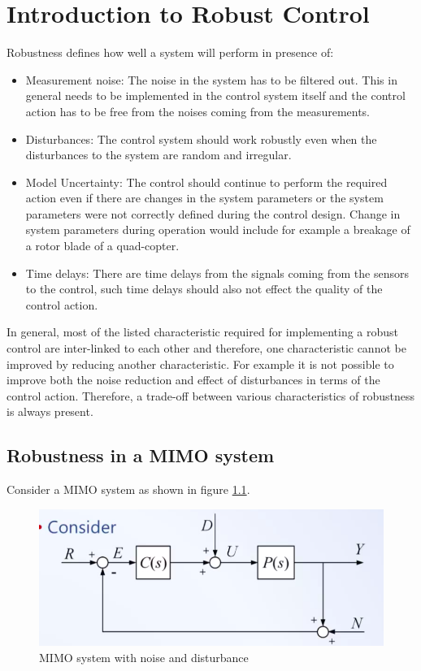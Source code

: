 \chapter{Introduction to Robust Control}

Robustness defines how well a system will perform in presence of:
\begin{itemize}
	\item Measurement noise: The noise in the system has to be filtered out. This in general needs to be implemented in the control system itself and the control action has to be free from the noises coming from the measurements.
	\item Disturbances: The control system should work robustly even when the disturbances to the system are random and irregular.
	\item Model Uncertainty: The control should continue to perform the required action even if there are changes in the system parameters or the system parameters were not correctly defined during the control design. Change in system parameters during operation would include for example a breakage of a rotor blade of a quad-copter.
	\item Time delays: There are time delays from the signals coming from the sensors to the control, such time delays should also not effect the quality of the control action.
\end{itemize}

In general, most of the listed characteristic required for implementing a robust control are inter-linked to each other and therefore, one characteristic cannot be improved by reducing another characteristic. For example it is not possible to improve both the noise reduction and effect of disturbances in terms of the control action. Therefore, a trade-off between various characteristics of robustness is always present.

\section{Robustness in a MIMO system}

Consider a MIMO system as shown in figure \ref{Fig_RC_MIMOsys}.
\begin{figure}[h!]
	\centering
	\includegraphics[width=0.8\linewidth]{Bilder/RC_MIMOsys}
	\caption{MIMO system with noise and disturbance}
	\label{Fig_RC_MIMOsys}
\end{figure}

